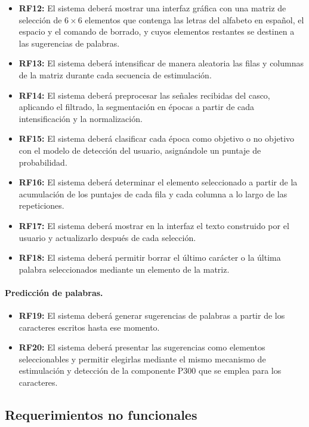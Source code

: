 \begin{itemize}
  \item \textbf{RF12:} El sistema deberá mostrar una interfaz gráfica con una matriz de selección
  de $6\times6$ elementos que contenga las letras del alfabeto en español, el espacio y el comando de borrado, y cuyos elementos restantes se destinen a las sugerencias de palabras.
  \item \textbf{RF13:} El sistema deberá intensificar de manera aleatoria las filas y columnas de
  la matriz durante cada secuencia de estimulación.
  \item \textbf{RF14:} El sistema deberá preprocesar las señales recibidas del casco, aplicando el
  filtrado, la segmentación en épocas a partir de cada intensificación y la normalización.
  \item \textbf{RF15:} El sistema deberá clasificar cada época como objetivo o no objetivo con el
  modelo de detección del usuario, asignándole un puntaje de probabilidad.
  \item \textbf{RF16:} El sistema deberá determinar el elemento seleccionado a partir de la
  acumulación de los puntajes de cada fila y cada columna a lo largo de las repeticiones.
  \item \textbf{RF17:} El sistema deberá mostrar en la interfaz el texto construido por el usuario
  y actualizarlo después de cada selección.
  \item \textbf{RF18:} El sistema deberá permitir borrar el último carácter o la última palabra
  seleccionados mediante un elemento de la matriz.
\end{itemize}

\paragraph{Predicción de palabras.}

\begin{itemize}
  \item \textbf{RF19:} El sistema deberá generar sugerencias de palabras a partir de los
  caracteres escritos hasta ese momento.
  \item \textbf{RF20:} El sistema deberá presentar las sugerencias como elementos seleccionables y
  permitir elegirlas mediante el mismo mecanismo de estimulación y detección de la componente
  P300 que se emplea para los caracteres.
\end{itemize}

\subsection{Requerimientos no funcionales}

